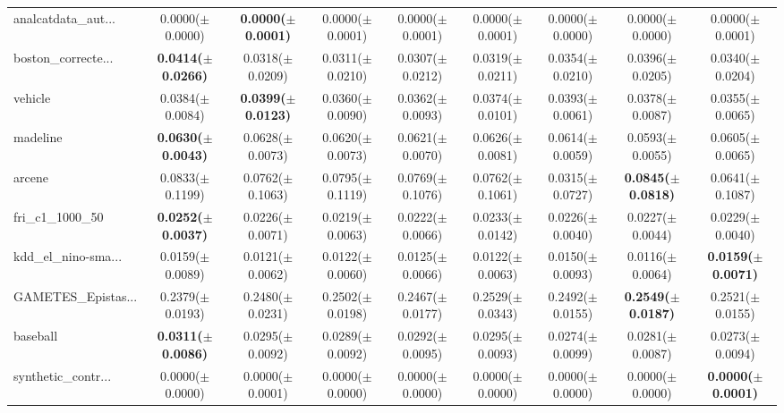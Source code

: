 \begin{longtable}{lcccccccc}
analcatdata\_aut... & 0.0000($\pm$0.0000) & \textbf{0.0000($\pm$0.0001)} & 0.0000($\pm$0.0001) & 0.0000($\pm$0.0001) & 0.0000($\pm$0.0001) & 0.0000($\pm$0.0000) & 0.0000($\pm$0.0000) & 0.0000($\pm$0.0001) \\
boston\_correcte... & \textbf{0.0414($\pm$0.0266)} & 0.0318($\pm$0.0209) & 0.0311($\pm$0.0210) & 0.0307($\pm$0.0212) & 0.0319($\pm$0.0211) & 0.0354($\pm$0.0210) & 0.0396($\pm$0.0205) & 0.0340($\pm$0.0204) \\
vehicle & 0.0384($\pm$0.0084) & \textbf{0.0399($\pm$0.0123)} & 0.0360($\pm$0.0090) & 0.0362($\pm$0.0093) & 0.0374($\pm$0.0101) & 0.0393($\pm$0.0061) & 0.0378($\pm$0.0087) & 0.0355($\pm$0.0065) \\
madeline & \textbf{0.0630($\pm$0.0043)} & 0.0628($\pm$0.0073) & 0.0620($\pm$0.0073) & 0.0621($\pm$0.0070) & 0.0626($\pm$0.0081) & 0.0614($\pm$0.0059) & 0.0593($\pm$0.0055) & 0.0605($\pm$0.0065) \\
arcene & 0.0833($\pm$0.1199) & 0.0762($\pm$0.1063) & 0.0795($\pm$0.1119) & 0.0769($\pm$0.1076) & 0.0762($\pm$0.1061) & 0.0315($\pm$0.0727) & \textbf{0.0845($\pm$0.0818)} & 0.0641($\pm$0.1087) \\
fri\_c1\_1000\_50 & \textbf{0.0252($\pm$0.0037)} & 0.0226($\pm$0.0071) & 0.0219($\pm$0.0063) & 0.0222($\pm$0.0066) & 0.0233($\pm$0.0142) & 0.0226($\pm$0.0040) & 0.0227($\pm$0.0044) & 0.0229($\pm$0.0040) \\
kdd\_el\_nino-sma... & 0.0159($\pm$0.0089) & 0.0121($\pm$0.0062) & 0.0122($\pm$0.0060) & 0.0125($\pm$0.0066) & 0.0122($\pm$0.0063) & 0.0150($\pm$0.0093) & 0.0116($\pm$0.0064) & \textbf{0.0159($\pm$0.0071)} \\
GAMETES\_Epistas... & 0.2379($\pm$0.0193) & 0.2480($\pm$0.0231) & 0.2502($\pm$0.0198) & 0.2467($\pm$0.0177) & 0.2529($\pm$0.0343) & 0.2492($\pm$0.0155) & \textbf{0.2549($\pm$0.0187)} & 0.2521($\pm$0.0155) \\
baseball & \textbf{0.0311($\pm$0.0086)} & 0.0295($\pm$0.0092) & 0.0289($\pm$0.0092) & 0.0292($\pm$0.0095) & 0.0295($\pm$0.0093) & 0.0274($\pm$0.0099) & 0.0281($\pm$0.0087) & 0.0273($\pm$0.0094) \\
synthetic\_contr... & 0.0000($\pm$0.0000) & 0.0000($\pm$0.0001) & 0.0000($\pm$0.0000) & 0.0000($\pm$0.0000) & 0.0000($\pm$0.0000) & 0.0000($\pm$0.0000) & 0.0000($\pm$0.0000) & \textbf{0.0000($\pm$0.0001)} \\
\bottomrule
\end{longtable}
